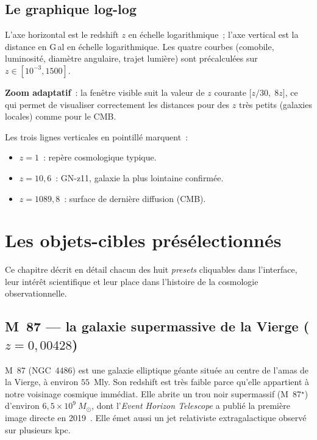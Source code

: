 \documentclass[11pt,a4paper,openany]{report}
\begin{document}
\section{Le graphique log-log}

L'axe horizontal est le redshift $z$ en échelle logarithmique~; l'axe
vertical est la distance en G\,al en échelle logarithmique. Les quatre courbes
(comobile, luminosité, diamètre angulaire, trajet lumière) sont précalculées
sur $z\in[10^{-3}, 1500]$.

\textbf{Zoom adaptatif}~: la fenêtre visible suit la valeur de $z$ courante
$\bigl[z/30,\;8z\bigr]$, ce qui permet de visualiser correctement les distances
pour des $z$ très petits (galaxies locales) comme pour le CMB.

Les trois lignes verticales en pointillé marquent~:
\begin{itemize}[topsep=2pt]
\item $z=1$~: repère cosmologique typique.
\item $z = 10{,}6$~: GN-z11, galaxie la plus lointaine confirmée.
\item $z = 1089{,}8$~: surface de dernière diffusion (CMB).
\end{itemize}

\chapter{Les objets-cibles présélectionnés}
\label{chap:presets}

Ce chapitre décrit en détail chacun des huit \emph{presets} cliquables dans
l'interface, leur intérêt scientifique et leur place dans l'histoire de la
cosmologie observationnelle.

\section{M~87 --- la galaxie supermassive de la Vierge ($z = 0{,}00428$)}

M~87 (NGC~4486) est une galaxie elliptique géante située au centre de l'amas
de la Vierge, à environ $55$~Mly. Son redshift est très faible parce qu'elle
appartient à notre voisinage cosmique immédiat. Elle abrite un trou noir
supermassif (M~87$^{\star}$) d'environ $6{,}5\times 10^{9}~M_{\odot}$, dont
l'\emph{Event Horizon Telescope} a publié la première image directe en
2019~\cite{EHT2019}. Elle émet aussi un jet relativiste extragalactique
observé sur plusieurs kpc.
\end{document}
